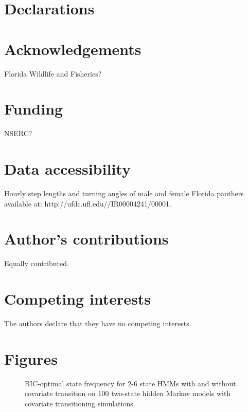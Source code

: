 \documentclass{bmcart}
\begin{document}

\section*{Declarations}

\begin{backmatter}

\section*{Acknowledgements}
  Florida Wildlife and Fisheries?
  
\section*{Funding}
 NSERC? 

\section{Data accessibility}
Hourly step lengths and turning angles of male and female Florida panthers available at: http://ufdc.ufl.edu//IR00004241/00001.

\section*{Author's contributions}
    Equally contributed.


\section*{Competing interests}
  The authors declare that they have no competing interests.



\section*{Figures}
  \begin{figure}[h!]
  \caption{ BIC-optimal state frequency for 2-6 state HMMs with and without covariate transition on 100 two-state hidden Markov models with covariate transitioning simulations.}
      \end{figure}


\end{backmatter}
\end{document}
